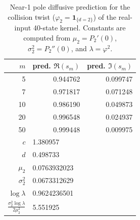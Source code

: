 \begin{table}[H]
\centering
\scriptsize
\setlength{\tabcolsep}{6pt}
\caption{Near-1 pole diffusive prediction for the collision twist ($\varphi_2=\mathbf{1}_{\{d=2\}}$) of the real-input 40-state kernel. Constants are computed from $\mu_2=P_2'(0)$, $\sigma_2^2=P_2''(0)$, and $\lambda=\varphi^2$.}
\label{tab:real_input_40_collision_near1_pole_predictions}
\begin{tabular}{r r r}
\toprule
$m$ & pred. $\Re(s_m)$ & pred. $\Im(s_m)$\\
\midrule
5 & 0.944762 & 0.099747\\
7 & 0.971817 & 0.071248\\
10 & 0.986190 & 0.049873\\
20 & 0.996548 & 0.024937\\
50 & 0.999448 & 0.009975\\
\midrule
$c$ & \multicolumn{2}{l}{1.380957}\\
$d$ & \multicolumn{2}{l}{0.498733}\\
$\mu_2$ & \multicolumn{2}{l}{0.0763932023}\\
$\sigma_2^2$ & \multicolumn{2}{l}{0.0673312629}\\
$\log\lambda$ & \multicolumn{2}{l}{0.9624236501}\\
$\frac{\sigma_2^2\log\lambda}{2\mu_2^2}$ & \multicolumn{2}{l}{5.551925}\\
\bottomrule
\end{tabular}
\end{table}
